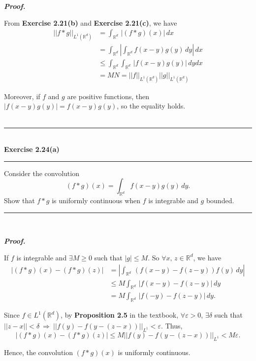 \documentclass[a4paper,11pt]{article}
\begin{document}
\textbf{\textit{Proof.}}

From \textbf{Exercise 2.21(b)} and \textbf{Exercise 2.21(c)}, we have
	$$\begin{aligned}
	||f \ast g ||_{L^1(\mathbb{R}^d)}
	&= \int_{\mathbb{R}^d}\,|(f \ast g)(x)|\,dx\\
	&= \int_{\mathbb{R}^d}\left|\int_{\mathbb{R}^d} f(x - y)g(y)\,dy\right|\,dx\\
	&\leq \int_{\mathbb{R}^d}\int_{\mathbb{R}^d}\,|f(x - y)g(y)|\,dydx\\
	&= MN = ||f||_{L^1(\mathbb{R}^d)} ||g||_{L^1(\mathbb{R}^d)}
	\end{aligned}$$

Moreover, if $f$ and $g$ are positive functions, then $|f(x - y)g(y)| = f(x - y)g(y)$, so the equality holds.\\\\



\newpage
\begin{flushleft}
	\rule[-0.5ex]{17cm}{2pt}\\
		\textbf{Exercise 2.24(a)}\\
	\rule[1.5ex]{17cm}{0.5pt}
		Consider the convolution
			$$(f \ast g)(x) = \int_{\mathbb{R}^d} f(x - y)g(y)\,dy.$$
		Show that $f \ast g$ is uniformly continuous when $f$ is integrable and $g$ bounded.
	\rule[1.0ex]{17cm}{0.5pt}\
\end{flushleft}

\textbf{\textit{Proof.}}

If $f$ is integrable and $\exists M \geq 0$ such that $|g| \leq M$. So $\forall x,\,z \in \mathbb{R}^d$, we have
	$$\begin{aligned}
	|(f \ast g)(x) - (f \ast g)(z)|
	&= \left|\int_{\mathbb{R}^d}\,(f(x - y) - f(z - y))f(y)\,dy\right|\\
	&\leq M \int_{\mathbb{R}^d}\,|f(x - y) - f(z - y)|\,dy\\
	&= M \int_{\mathbb{R}^d}\,|f(- y) - f(z - y)|\,dy.
	\end{aligned}$$

Since $f \in L^1(\mathbb{R}^d)$, by \textbf{Proposition 2.5} in the textbook, $\forall \varepsilon > 0$, $\exists \delta$ such that $||z - x|| < \delta\ \Rightarrow\ ||f(y) - f(y - (z - x))||_{L^1} < \varepsilon$. Thus,
	$$|(f \ast g)(x) - (f \ast g)(z)| \leq M ||f(y) - f(y - (z - x))||_{L^1} < M\varepsilon.$$

Hence, the convolution $(f \ast g)(x)$ is uniformly continuous.\\\\\\
\end{document}
